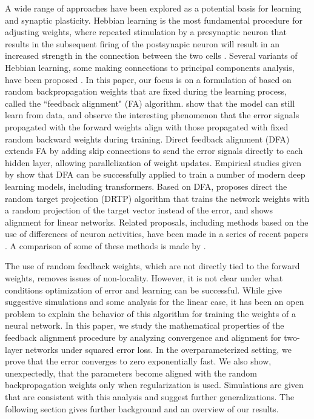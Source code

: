 A wide range of approaches have been explored as a potential basis for learning and synaptic plasticity. Hebbian learning is the most fundamental procedure for adjusting weights, where
repeated stimulation by a presynaptic neuron that results in the subsequent
firing of the postsynapic neuron will result in an increased strength in the connection
between the two cells \citep{hebb1,paulsen}. Several variants of Hebbian learning, some making connections to principal components analysis, have been proposed
\citep{oja,sejnowski1,sejnowski2}.
In this paper, our focus is on a formulation of \cite{lillicrap2016random} based on random backpropagation weights that are fixed during the learning process, called the ``feedback alignment" (FA) algorithm.
\cite{lillicrap2016random} show that the model can still learn from data, and observe the interesting phenomenon that the error signals propagated with the forward weights align with those propagated with fixed random backward weights during training. Direct feedback alignment (DFA) \citep{nokland2016direct} extends FA by adding skip connections to send the error signals directly to each hidden layer, allowing parallelization of weight updates. Empirical studies given by \citet{launay2020direct} show that DFA can be successfully applied to train a number of modern deep learning models, including transformers. Based on DFA, \citet{frenkel2021learning} proposes direct the random target projection (DRTP) algorithm that trains the network weights with a random projection of the target vector instead of the error, and shows alignment for linear networks.
Related proposals, including methods based on the use of differences of neuron activities, have been made in a series of recent papers \citep{akrout,bellec,lillicrap2020backpropagation}. A comparison of some of these methods is made by \cite{bartunov}.

The use of random feedback weights, which are not directly tied to the forward weights, removes issues of non-locality. However, it is not clear under what conditions optimization of error and learning can be successful.
While \mbox{\citet{lillicrap2016random}} give suggestive simulations and some analysis for the linear case, it has been an open problem to explain the behavior of this algorithm for training the weights of a neural network.
In this paper, we study the mathematical properties of the feedback alignment procedure by analyzing convergence and alignment for two-layer networks under squared error loss. In the overparameterized setting, we prove that the error converges to zero exponentially fast. We also show, unexpectedly, that the parameters become aligned with the random backpropagation weights only when regularization is used. Simulations are given that are consistent with this analysis and suggest further generalizations. The following section gives further background and an overview of our results.
